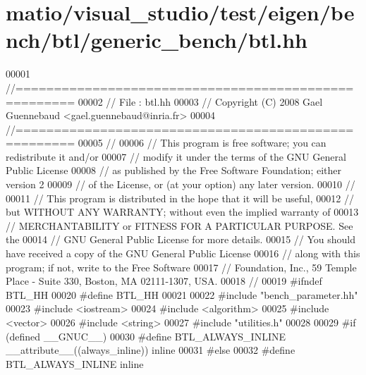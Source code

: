 \hypertarget{matio_2visual__studio_2test_2eigen_2bench_2btl_2generic__bench_2btl_8hh_source}{}\section{matio/visual\+\_\+studio/test/eigen/bench/btl/generic\+\_\+bench/btl.hh}
\label{matio_2visual__studio_2test_2eigen_2bench_2btl_2generic__bench_2btl_8hh_source}

\begin{DoxyCode}
00001 \textcolor{comment}{//=====================================================}
00002 \textcolor{comment}{// File   :  btl.hh}
00003 \textcolor{comment}{// Copyright (C) 2008 Gael Guennebaud <gael.guennebaud@inria.fr>}
00004 \textcolor{comment}{//=====================================================}
00005 \textcolor{comment}{//}
00006 \textcolor{comment}{// This program is free software; you can redistribute it and/or}
00007 \textcolor{comment}{// modify it under the terms of the GNU General Public License}
00008 \textcolor{comment}{// as published by the Free Software Foundation; either version 2}
00009 \textcolor{comment}{// of the License, or (at your option) any later version.}
00010 \textcolor{comment}{//}
00011 \textcolor{comment}{// This program is distributed in the hope that it will be useful,}
00012 \textcolor{comment}{// but WITHOUT ANY WARRANTY; without even the implied warranty of}
00013 \textcolor{comment}{// MERCHANTABILITY or FITNESS FOR A PARTICULAR PURPOSE.  See the}
00014 \textcolor{comment}{// GNU General Public License for more details.}
00015 \textcolor{comment}{// You should have received a copy of the GNU General Public License}
00016 \textcolor{comment}{// along with this program; if not, write to the Free Software}
00017 \textcolor{comment}{// Foundation, Inc., 59 Temple Place - Suite 330, Boston, MA  02111-1307, USA.}
00018 \textcolor{comment}{//}
00019 \textcolor{preprocessor}{#ifndef BTL\_HH}
00020 \textcolor{preprocessor}{#define BTL\_HH}
00021 
00022 \textcolor{preprocessor}{#include "bench\_parameter.hh"}
00023 \textcolor{preprocessor}{#include <iostream>}
00024 \textcolor{preprocessor}{#include <algorithm>}
00025 \textcolor{preprocessor}{#include <vector>}
00026 \textcolor{preprocessor}{#include <string>}
00027 \textcolor{preprocessor}{#include "utilities.h"}
00028 
00029 \textcolor{preprocessor}{#if (defined \_\_GNUC\_\_)}
00030 \textcolor{preprocessor}{#define BTL\_ALWAYS\_INLINE \_\_attribute\_\_((always\_inline)) inline}
00031 \textcolor{preprocessor}{#else}
00032 \textcolor{preprocessor}{#define BTL\_ALWAYS\_INLINE inline}

\end{DoxyCode}
